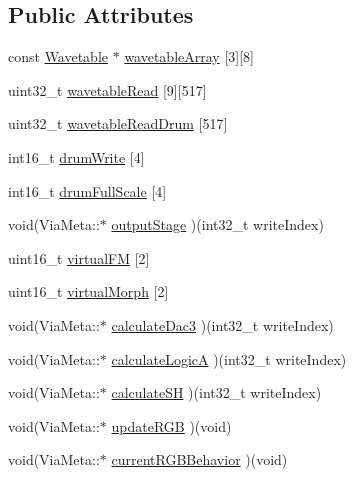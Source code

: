 \subsection*{Public Attributes}
\begin{DoxyCompactItemize}
\item 
const \mbox{\hyperlink{struct_wavetable}{Wavetable}} $\ast$ \mbox{\hyperlink{class_via_meta_a62891dea61827785487b4b8f2ada5641}{wavetable\+Array}} \mbox{[}3\mbox{]}\mbox{[}8\mbox{]}
\item 
uint32\+\_\+t \mbox{\hyperlink{class_via_meta_aedee75e7f255d70c7292972d5e5eef65}{wavetable\+Read}} \mbox{[}9\mbox{]}\mbox{[}517\mbox{]}
\item 
uint32\+\_\+t \mbox{\hyperlink{class_via_meta_a8b0b6f0072b72144fe3f894b6303a0d4}{wavetable\+Read\+Drum}} \mbox{[}517\mbox{]}
\item 
int16\+\_\+t \mbox{\hyperlink{class_via_meta_a2650520c89c5e41f90571a6670cc3786}{drum\+Write}} \mbox{[}4\mbox{]}
\item 
int16\+\_\+t \mbox{\hyperlink{class_via_meta_af67df1f1a9de4ee090de75709c9e8445}{drum\+Full\+Scale}} \mbox{[}4\mbox{]}
\item 
void(Via\+Meta\+::$\ast$ \mbox{\hyperlink{class_via_meta_ab0b9e808d133a9bc00bca8ecc5928b87}{output\+Stage}} )(int32\+\_\+t write\+Index)
\item 
uint16\+\_\+t \mbox{\hyperlink{class_via_meta_a3a04782d64b83dd605cab1e67742d476}{virtual\+FM}} \mbox{[}2\mbox{]}
\item 
uint16\+\_\+t \mbox{\hyperlink{class_via_meta_a8915cefaa524a38f30f7d80a3f61f69b}{virtual\+Morph}} \mbox{[}2\mbox{]}
\item 
void(Via\+Meta\+::$\ast$ \mbox{\hyperlink{class_via_meta_a20f99319d993114f391102f7cadd558d}{calculate\+Dac3}} )(int32\+\_\+t write\+Index)
\item 
void(Via\+Meta\+::$\ast$ \mbox{\hyperlink{class_via_meta_a5dabe309f8cc5990a11eb2eb5fb7d872}{calculate\+LogicA}} )(int32\+\_\+t write\+Index)
\item 
void(Via\+Meta\+::$\ast$ \mbox{\hyperlink{class_via_meta_abd9b66a2e79446a5275fad25ef40e90f}{calculate\+SH}} )(int32\+\_\+t write\+Index)
\item 
void(Via\+Meta\+::$\ast$ \mbox{\hyperlink{class_via_meta_a56b5fee57636b4d7b6b0be80145ae474}{update\+R\+GB}} )(void)
\item 
void(Via\+Meta\+::$\ast$ \mbox{\hyperlink{class_via_meta_adf6d6ae0cdfa6275d756988494c72bda}{current\+R\+G\+B\+Behavior}} )(void)
\item 

\end{DoxyCompactItemize}
